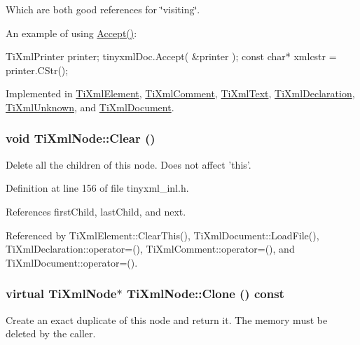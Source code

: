 Which are both good references for \char`\"{}visiting\char`\"{}.

An example of using \hyperlink{class_ti_xml_node_acc0f88b7462c6cb73809d410a4f5bb86}{Accept()}: \begin{DoxyVerb}
      TiXmlPrinter printer;
      tinyxmlDoc.Accept( &printer );
      const char* xmlcstr = printer.CStr();
      \end{DoxyVerb}
 

Implemented in \hyperlink{class_ti_xml_element_a31ab28cc3b892a69254391d6bbe08df3}{TiXmlElement}, \hyperlink{class_ti_xml_comment_a4382de0e50da973f11a23ea5852568bd}{TiXmlComment}, \hyperlink{class_ti_xml_text_a43b9954ebf679557fac1a4453f337b7c}{TiXmlText}, \hyperlink{class_ti_xml_declaration_ab6a6b178161ba9abc2c35058de689864}{TiXmlDeclaration}, \hyperlink{class_ti_xml_unknown_a4e54d7482e05a837cf83c925cc683380}{TiXmlUnknown}, and \hyperlink{class_ti_xml_document_a3daab2f472418ef66315750202f762ae}{TiXmlDocument}.\hypertarget{class_ti_xml_node_a708e7f953df61d4d2d12f73171550a4b}{
\subsubsection[{Clear}]{\setlength{\rightskip}{0pt plus 5cm}void TiXmlNode::Clear ()}}
\label{class_ti_xml_node_a708e7f953df61d4d2d12f73171550a4b}


Delete all the children of this node. Does not affect 'this'. 

Definition at line 156 of file tinyxml\_\-inl.h.

References firstChild, lastChild, and next.

Referenced by TiXmlElement::ClearThis(), TiXmlDocument::LoadFile(), TiXmlDeclaration::operator=(), TiXmlComment::operator=(), and TiXmlDocument::operator=().\hypertarget{class_ti_xml_node_a4508cc3a2d7a98e96a54cc09c37a78a4}{
\subsubsection[{Clone}]{\setlength{\rightskip}{0pt plus 5cm}virtual {\bf TiXmlNode}$\ast$ TiXmlNode::Clone () const}}
\label{class_ti_xml_node_a4508cc3a2d7a98e96a54cc09c37a78a4}
Create an exact duplicate of this node and return it. The memory must be deleted by the caller. 

